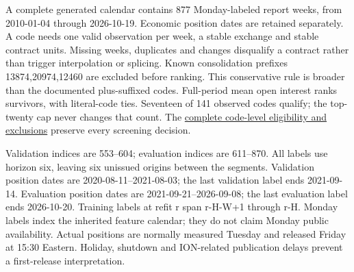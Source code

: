 \documentclass[10pt,a4paper]{article}
\begin{document}
A complete generated calendar contains 877 Monday-labeled report weeks, from 2010-01-04 through 2026-10-19. Economic position dates are retained separately. A code needs one valid observation per week, a stable exchange and stable contract units. Missing weeks, duplicates and changes disqualify a contract rather than trigger interpolation or splicing. Known consolidation prefixes 13874,20974,12460 are excluded before ranking. This conservative rule is broader than the documented plus-suffixed codes. Full-period mean open interest ranks survivors, with literal-code ties. Seventeen of 141 observed codes qualify; the top-twenty cap never changes that count.
The \href{https://github.com/ByronLi0207/financial-mathematics-paper-20261020/blob/revision-v10b/results/v10/cftc/eligibility.json}{complete code-level eligibility and exclusions} preserve every screening decision.

Validation indices are 553--604; evaluation indices are 611--870. All labels use horizon six, leaving six unissued origins between the segments. Validation position dates are 2020-08-11--2021-08-03; the last validation label ends 2021-09-14. Evaluation position dates are 2021-09-21--2026-09-08; the last evaluation label ends 2026-10-20. Training labels at refit r span r-H-W+1 through r-H. Monday labels index the inherited feature calendar; they do not claim Monday public availability. Actual positions are normally measured Tuesday and released Friday at 15:30 Eastern. Holiday, shutdown and ION-related publication delays prevent a first-release interpretation.
\end{document}
